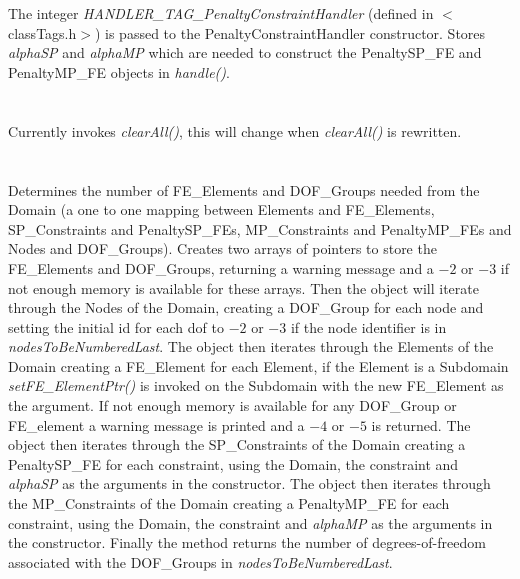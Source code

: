  \\
\\ 
The integer {\em HANDLER\_TAG\_PenaltyConstraintHandler} (defined in
$<$classTags.h$>$) is passed to the PenaltyConstraintHandler
constructor. Stores {\em alphaSP} and {\em alphaMP} which are needed
to construct the PenaltySP\_FE and PenaltyMP\_FE objects in {\em
handle()}. \\

 \\
\\ 
Currently invokes {\em clearAll()}, this will change when {\em
clearAll()} is rewritten. \\

\\
 \\
Determines the number of FE\_Elements and DOF\_Groups needed from the
Domain (a one to one mapping between Elements and FE\_Elements,
SP\_Constraints and PenaltySP\_FEs, MP\_Constraints and PenaltyMP\_FEs and
Nodes and DOF\_Groups). Creates two arrays of pointers to store the
FE\_Elements and DOF\_Groups, returning a warning message and a $-2$
or $-3$ if not enough memory is available for these arrays. Then the
object will iterate through the Nodes of the Domain, creating a
DOF\_Group for each node and setting the initial id for each dof to
$-2$ or $-3$ if the node identifier is in {\em
nodesToBeNumberedLast}. The object then iterates through the Elements
of the Domain creating a FE\_Element for each Element, if the Element
is a Subdomain {\em setFE\_ElementPtr()} is invoked on the Subdomain
with the new FE\_Element as the argument. If not enough memory is
available for any DOF\_Group or FE\_element a warning message is
printed and a $-4$ or $-5$ is returned. 
The object then iterates through the SP\_Constraints
of the Domain creating a PenaltySP\_FE for each constraint, using the
Domain, the constraint and {\em alphaSP} as the arguments in the
constructor.
The object then iterates through the MP\_Constraints
of the Domain creating a PenaltyMP\_FE for each constraint, using the
Domain, the constraint and {\em alphaMP} as the arguments in the constructor.
Finally the method returns the
number of degrees-of-freedom associated with the DOF\_Groups in {\em
nodesToBeNumberedLast}. \\

